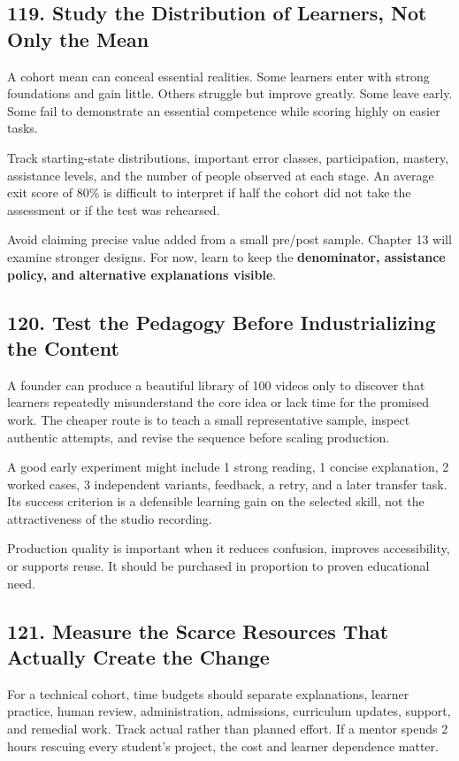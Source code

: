 \subsection*{119. Study the Distribution of Learners, Not Only the Mean}

A cohort mean can conceal essential realities. Some learners enter with strong foundations and gain little. Others struggle but improve greatly. Some leave early. Some fail to demonstrate an essential competence while scoring highly on easier tasks.

Track starting-state distributions, important error classes, participation, mastery, assistance levels, and the number of people observed at each stage. An average exit score of 80\% is difficult to interpret if half the cohort did not take the assessment or if the test was rehearsed.

Avoid claiming precise value added from a small pre/post sample. Chapter 13 will examine stronger designs. For now, learn to keep the \textbf{denominator, assistance policy, and alternative explanations visible}.

\subsection*{120. Test the Pedagogy Before Industrializing the Content}

A founder can produce a beautiful library of 100 videos only to discover that learners repeatedly misunderstand the core idea or lack time for the promised work. The cheaper route is to teach a small representative sample, inspect authentic attempts, and revise the sequence before scaling production.

A good early experiment might include 1 strong reading, 1 concise explanation, 2 worked cases, 3 independent variants, feedback, a retry, and a later transfer task. Its success criterion is a defensible learning gain on the selected skill, not the attractiveness of the studio recording.

Production quality is important when it reduces confusion, improves accessibility, or supports reuse. It should be purchased in proportion to proven educational need.

\subsection*{121. Measure the Scarce Resources That Actually Create the Change}

For a technical cohort, time budgets should separate explanations, learner practice, human review, administration, admissions, curriculum updates, support, and remedial work. Track actual rather than planned effort. If a mentor spends 2 hours rescuing every student's project, the cost and learner dependence matter.

